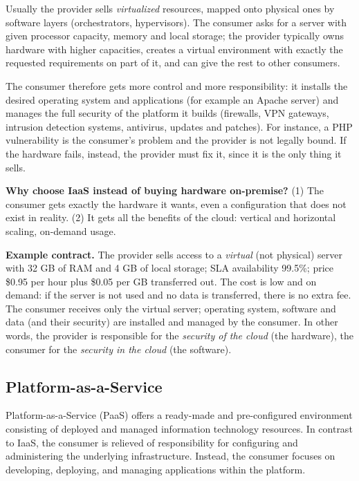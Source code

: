 Usually the provider sells \emph{virtualized} resources, mapped onto physical ones by software layers (orchestrators, hypervisors). The consumer asks for a server with given processor capacity, memory and local storage; the provider typically owns hardware with higher capacities, creates a virtual environment with exactly the requested requirements on part of it, and can give the rest to other consumers.

The consumer therefore gets more control and more responsibility: it installs the desired operating system and applications (for example an Apache server) and manages the full security of the platform it builds (firewalls, VPN gateways, intrusion detection systems, antivirus, updates and patches). For instance, a PHP vulnerability is the consumer's problem and the provider is not legally bound. If the hardware fails, instead, the provider must fix it, since it is the only thing it sells.

\begin{notebox}
	\textbf{Why choose IaaS instead of buying hardware on-premise?} (1) The consumer gets exactly the hardware it wants, even a configuration that does not exist in reality. (2) It gets all the benefits of the cloud: vertical and horizontal scaling, on-demand usage.
\end{notebox}

\textbf{Example contract.} The provider sells access to a \emph{virtual} (not physical) server with 32 GB of RAM and 4 GB of local storage; SLA availability 99.5\%; price \$0.95 per hour plus \$0.05 per GB transferred out. The cost is low and on demand: if the server is not used and no data is transferred, there is no extra fee. The consumer receives only the virtual server; operating system, software and data (and their security) are installed and managed by the consumer. In other words, the provider is responsible for the \emph{security of the cloud} (the hardware), the consumer for the \emph{security in the cloud} (the software).

\begin{center}
\end{center}

\subsection{Platform-as-a-Service}

Platform-as-a-Service (PaaS) offers a ready-made and pre-configured environment consisting of deployed and managed information technology resources. In contrast to IaaS, the consumer is relieved of responsibility for configuring and administering the underlying infrastructure. Instead, the consumer focuses on developing, deploying, and managing applications within the platform.

